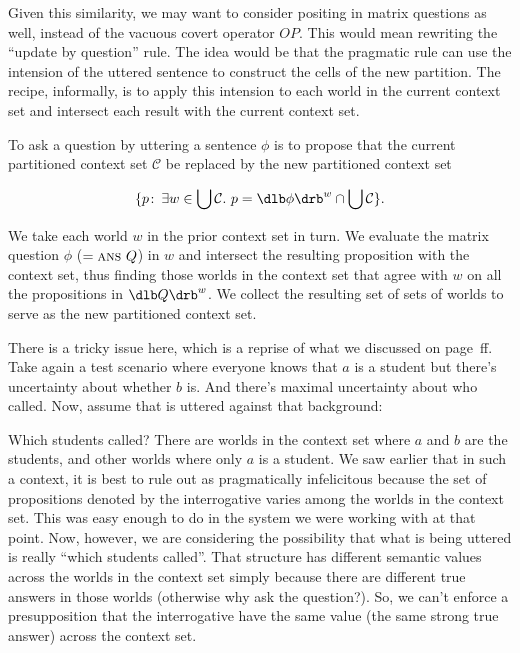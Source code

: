 Given this similarity, we may want to consider positing \ans in matrix questions
as well, instead of the vacuous covert operator $OP$. This would mean rewriting
the ``update by question'' rule. The idea would be that the pragmatic rule can
use the intension of the uttered sentence to construct the cells of the new
partition. The recipe, informally, is to apply this intension to each world in
the current context set and intersect each result with the current context set.

\begin{definition}\label{def:updatebyquestiondraftrevision}%
  To ask a question by uttering a sentence $\phi$ is to propose that the current
  partitioned context set $\mathcal{C}$ be replaced by the new partitioned
  context set

\[\{p\co \exists w\in\bigcup\mathcal{C}.\ p = \sv{\phi}^{w}\cap \bigcup\mathcal{C}\}.\]

\end{definition}
%
We take each world $w$ in the prior context set in turn. We evaluate the matrix
question $\phi$ ($= \textsc{ans}\ Q$) in $w$ and intersect the resulting proposition
with the context set, thus finding those worlds in the context set that agree
with $w$ on all the propositions in $\sv{Q}^{w}$. We collect the resulting set
of sets of worlds to serve as the new partitioned context set.

There is a tricky issue here, which is a reprise of what we discussed on
page~\pageref{par:context-uncertainty}ff. Take again a test scenario where
everyone knows that $a$ is a student but there's uncertainty about whether $b$
is. And there's maximal uncertainty about who called. Now, assume that \Next is
uttered against that background:

\ex Which students called?\xe
%
There are worlds in the context set where $a$ and $b$ are the students, and
other worlds where only $a$ is a student. We saw earlier that in such a context,
it is best to rule \Last out as pragmatically infelicitous because the set of
propositions denoted by the interrogative varies among the worlds in the context
set. This was easy enough to do in the system we were working with at that
point. Now, however, we are considering the possibility that what is being
uttered is really ``\ans which students called''. That structure has different
semantic values across the worlds in the context set simply because there are
different true answers in those worlds (otherwise why ask the question?). %
%
So, we can't enforce a presupposition that the interrogative have the same value
(the same strong true answer) across the context set.

